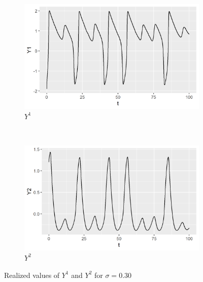 \documentclass[a4paper]{article}
\begin{document}
\begin{figure}
    \centering
    \begin{subfigure}[b]{0.45\textwidth}
        \includegraphics[width=\textwidth]{part1a-sigma3-Y1.png}
        \caption{$Y^1$}
    \end{subfigure}
    ~
    \begin{subfigure}[b]{0.45\textwidth}
        \includegraphics[width=\textwidth]{part1a-sigma3-Y2.png}
        \caption{$Y^2$}
    \end{subfigure}
    \caption{Realized values of $Y^1$ and $Y^2$ for $\sigma = 0.30$}\label{fig:part1a-sigma3}
\end{figure}
\end{document}
